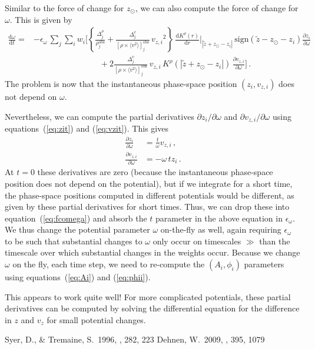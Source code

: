 \documentclass[12pt,preprint]{aastex}
\newcommand{\dd}{\mathrm{d}}
\newcommand{\eqnname}{equation}
\newcommand{\equationname}{\eqnname}
\newcommand{\zsun}{\ensuremath{z_\odot}}
\newcommand{\vz}{\ensuremath{v_z}}
\newcommand{\vzi}{\ensuremath{v_{z,i}}}
\newcommand{\zi}{\ensuremath{z_i}}
\newcommand{\wi}{\ensuremath{w_i}}
\newcommand{\Ai}{\ensuremath{A_i}}
\newcommand{\phii}{\ensuremath{\phi_i}}
\newcommand{\zobs}{\ensuremath{\tilde{z}}}
\newcommand{\eps}{\ensuremath{\epsilon}}
\begin{document}
Similar to the force of change for \zsun, we can also compute the
force of change for $\omega$. This is given by
\begin{equation}\label{eq:fcomega}
\begin{split}
  \frac{\dd \omega}{\dd t} = & -\eps_\omega\,\sum_j \sum_i \wi \Bigg[\left\{\frac{\Delta^\rho_j}{\rho^{\mathrm{obs}}_j}+\frac{\Delta^v_j}{[\rho\times\langle v^2 \rangle]_j^{\mathrm{obs}}}\,\vzi^2\right\}\,\frac{\dd K^\rho(r)}{\dd r}\Bigg|_{|\zobs+\zsun-\zi|}\,\mathrm{sign}(\zobs-\zsun-\zi)\frac{\partial \zi}{\partial \omega}\,\\
  & \qquad \qquad \qquad \qquad +2\frac{\Delta^v_j}{[\rho\times\langle v^2 \rangle]_j^{\mathrm{obs}}} \,\vzi\,K^\rho(|\zobs+\zsun-\zi|)\,\frac{\partial \vzi}{\partial \omega}\Bigg]\,.
\end{split}
\end{equation}
The problem is now that the instantaneous phase-space position
$(\zi,\vzi)$ does not depend on $\omega$.

Nevertheless, we can compute the partial derivatives $\partial \zi /
\partial \omega$ and $\partial \vzi / \partial \omega$ using
\equationname s~(\ref{eq:zit}) and (\ref{eq:vzit}). This gives
\begin{align}
  \frac{\partial \zi}{\partial \omega} & = \frac{t}{\omega} \vzi\,,\\
  \frac{\partial \vzi}{\partial \omega} & = -\omega\,t \zi\,.
\end{align}
At $t=0$ these derivatives are zero (because the instantaneous
phase-space position does not depend on the potential), but if we
integrate for a short time, the phase-space positions computed in
different potentials would be different, as given by these partial
derivatives for short times. Thus, we can drop these into
\equationname~(\ref{eq:fcomega}) and absorb the $t$ parameter in the
above equation in $\eps_\omega$. We thus change the potential
parameter $\omega$ on-the-fly as well, again requiring $\eps_\omega$
to be such that substantial changes to $\omega$ only occur on
timescales $\gg$ than the timescale over which substantial changes in
the weights occur. Because we change $\omega$ on the fly, each time
step, we need to re-compute the $(\Ai,\phii)$ parameters using
\equationname s~(\ref{eq:Ai}) and (\ref{eq:phii}).

This appears to work quite well! For more complicated potentials,
these partial derivatives can be computed by solving the differential
equation for the difference in $z$ and $\vz$ for small potential
changes.



\begin{thebibliography}{}
 Syer, D., \& Tremaine,
  S.\ 1996, \mnras, 282, 223
  Dehnen, W.\ 2009, \mnras, 395, 1079
\end{thebibliography}
\end{document}
